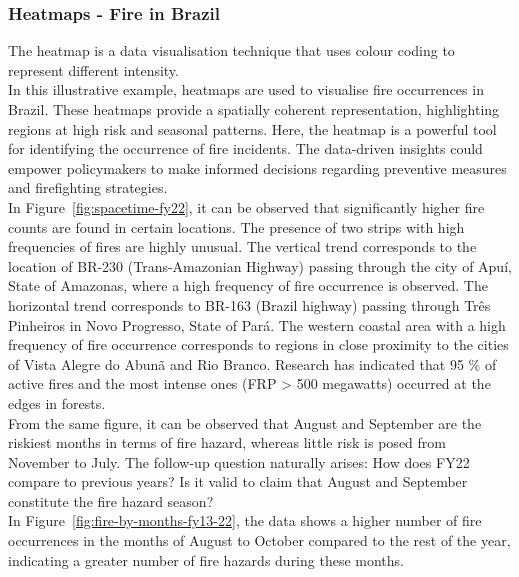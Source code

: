 \documentclass{article}\usepackage[]{graphicx}\usepackage[]{xcolor}
\begin{document}
\subsubsection{Heatmaps - Fire in Brazil}

The heatmap is a data visualisation technique that uses colour coding to represent different intensity.\\

\noindent
In this illustrative example, heatmaps are used to visualise fire occurrences in Brazil. These heatmaps provide a spatially coherent representation, highlighting regions at high risk and seasonal patterns. Here, the heatmap is a powerful tool for identifying the occurrence of fire incidents. The data-driven insights could empower policymakers to make informed decisions regarding preventive measures and firefighting strategies.\\

\noindent
In Figure~\ref{fig:spacetime-fy22}, it can be observed that significantly higher fire counts are found in certain locations. The presence of two strips with high frequencies of fires are highly unusual.  The vertical trend corresponds to the location of BR-230 (Trans-Amazonian Highway) passing through the city of Apuí, State of Amazonas, where a high frequency of fire occurrence is observed.  The horizontal trend corresponds to BR-163 (Brazil highway) passing through Três Pinheiros in Novo Progresso, State of Pará. The western coastal area with a high frequency of fire occurrence corresponds to regions in close proximity to the cities of Vista Alegre do Abunã and Rio Branco. Research has indicated that 95 \% of active fires and the most intense ones (FRP > 500 megawatts) occurred at the edges in forests.\\

\noindent
From the same figure, it can be observed that August and September are the riskiest months in terms of fire hazard, whereas little risk is posed from November to July. The follow-up question naturally arises: How does FY22 compare to previous years? Is it valid to claim that August and September constitute the fire hazard season?\\

\noindent
In Figure~\ref{fig:fire-by-months-fy13-22}, the data shows a higher number of fire occurrences in the months of August to October compared to the rest of the year, indicating a greater number of fire hazards during these months.
\end{document}

